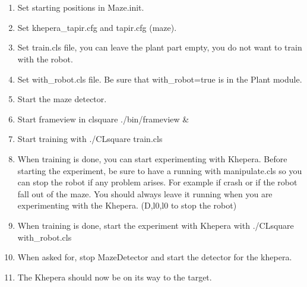 \section{\clsquare}
\label{sec:howto:clsquare}

    \begin{enumerate}
        \item Set starting positions in Maze.init.
        \item Set khepera\_tapir.cfg and tapir.cfg (maze).
        \item Set train.cls file, you can leave the plant part empty, 
            you do not want to train with the robot.
        \item Set with\_robot.cls file. Be sure that with\_robot=true is in 
            the Plant module.
        \item Start the maze detector.
        \item Start frameview in clsquare ./bin/frameview \&
        \item Start training with ./CLsquare train.cls
        \item When training is done, you can start experimenting with 
            Khepera. Before starting the experiment, be sure to have a 
            \clsquare{} running with manipulate.cls so you can stop the 
            robot if any problem arises. For example if \clsquare{} crash 
            or if the robot fall out of the maze. You should always 
            leave it running when you are experimenting with the 
            Khepera. (D,l0,l0 to stop the robot)
        \item When training is done, start the experiment with Khepera 
            with ./CLsquare with\_robot.cls
        \item When asked for, stop MazeDetector and start the detector 
            for the khepera.
        \item The Khepera should now be on its way to the target.
    \end{enumerate}

